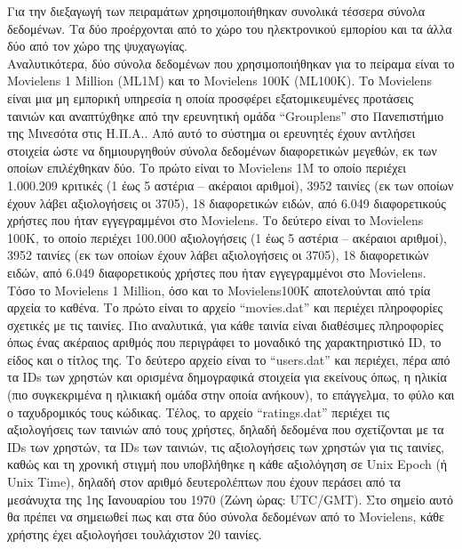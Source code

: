 \noindent  Για την διεξαγωγή των πειραμάτων χρησιμοποιήθηκαν συνολικά τέσσερα σύνολα δεδομένων. Τα δύο προέρχονται από το χώρο του ηλεκτρονικού εμπορίου και τα άλλα δύο από τον χώρο της ψυχαγωγίας.\\ Αναλυτικότερα, δύο σύνολα δεδομένων που χρησιμοποιήθηκαν για το πείραμα είναι το Movielens 1 Million (ML1M) και το Movielens 100K (ML100K). Το Movielens \cite{harperMovieLensDatasetsHistory2015} είναι μια μη εμπορική υπηρεσία η οποία προσφέρει εξατομικευμένες προτάσεις ταινιών και αναπτύχθηκε από την ερευνητική ομάδα “Grouplens” στο Πανεπιστήμιο της Μινεσότα στις Η.Π.Α.. Από αυτό το σύστημα οι ερευνητές έχουν αντλήσει στοιχεία ώστε να δημιουργηθούν σύνολα δεδομένων διαφορετικών μεγεθών, εκ των οποίων επιλέχθηκαν δύο. Το πρώτο είναι το Movielens 1M το οποίο περιέχει 1.000.209 κριτικές (1 έως 5 αστέρια – ακέραιοι αριθμοί), 3952 ταινίες (εκ των οποίων έχουν λάβει αξιολογήσεις οι 3705), 18 διαφορετικών ειδών, από 6.049 διαφορετικούς χρήστες που ήταν εγγεγραμμένοι στο Movielens. Το δεύτερο είναι το Movielens 100K, το οποίο περιέχει 100.000 αξιολογήσεις (1 έως 5 αστέρια – ακέραιοι αριθμοί), 3952 ταινίες (εκ των οποίων έχουν λάβει αξιολογήσεις οι 3705), 18 διαφορετικών ειδών, από 6.049 διαφορετικούς χρήστες που ήταν εγγεγραμμένοι στο Movielens. Τόσο το Movielens 1 Million, όσο και το Movielens100K αποτελούνται από τρία αρχεία το καθένα. Το πρώτο είναι το αρχείο “movies.dat” και περιέχει πληροφορίες σχετικές με τις ταινίες. Πιο αναλυτικά, για κάθε ταινία είναι διαθέσιμες πληροφορίες όπως ένας ακέραιος αριθμός που περιγράφει το μοναδικό της χαρακτηριστικό ID, το είδος και ο τίτλος της. Το δεύτερο αρχείο είναι το “users.dat” και περιέχει, πέρα από τα IDs των χρηστών και ορισμένα δημογραφικά στοιχεία για εκείνους όπως, η ηλικία (πιο συγκεκριμένα η ηλικιακή ομάδα στην οποία ανήκουν), το επάγγελμα, το φύλο και ο ταχυδρομικός τους κώδικας. Τέλος, το αρχείο “ratings.dat” περιέχει τις αξιολογήσεις των ταινιών από τους χρήστες, δηλαδή δεδομένα που σχετίζονται με τα IDs των χρηστών, τα IDs των ταινιών, τις αξιολογήσεις των χρηστών για τις ταινίες, καθώς και τη χρονική στιγμή που υποβλήθηκε η κάθε αξιολόγηση σε Unix Epoch (ή Unix Time), δηλαδή στον αριθμό δευτερολέπτων που έχουν περάσει από τα μεσάνυχτα της 1ης Ιανουαρίου του 1970 (Ζώνη ώρας: UTC/GMT). Στο σημείο αυτό θα πρέπει να σημειωθεί πως και στα δύο σύνολα δεδομένων από το Movielens, κάθε χρήστης έχει αξιολογήσει τουλάχιστον 20 ταινίες. \\\\
